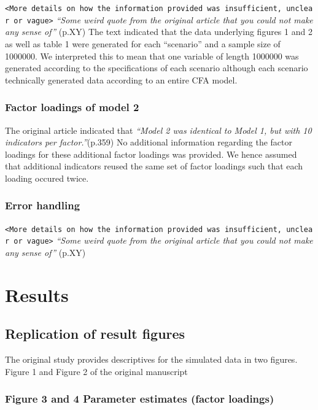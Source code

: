 \documentclass[10,a4paperpaper,]{article}
\begin{document}
\texttt{\textless{}More\ details\ on\ how\ the\ information\ provided\ was\ insufficient,\ unclear\ or\ vague\textgreater{}}
\emph{``Some weird quote from the original article that you could not
make any sense of''} (p.XY) The text indicated that the data underlying
figures 1 and 2 as well as table 1 were generated for each ``scenario''
and a sample size of 1000000. We interpreted this to mean that one
variable of length 1000000 was generated according to the specifications
of each scenario although each scenario technically generated data
according to an entire CFA model.

\subsubsection{Factor loadings of model 2}

The original article indicated that \emph{``Model 2 was identical to
Model 1, but with 10 indicators per factor.''}(p.359) No additional
information regarding the factor loadings for these additional factor
loadings was provided. We hence assumed that additional indicators
reused the same set of factor loadings such that each loading occured
twice.

\subsubsection{Error handling}

\texttt{\textless{}More\ details\ on\ how\ the\ information\ provided\ was\ insufficient,\ unclear\ or\ vague\textgreater{}}
\emph{``Some weird quote from the original article that you could not
make any sense of''} (p.XY)

\section{Results}

\subsection{Replication of result figures}

The original study provides descriptives for the simulated data in two
figures. Figure 1 and Figure 2 of the original manuscript

\subsubsection{Figure 3 and 4 Parameter estimates (factor loadings)}
\end{document}
